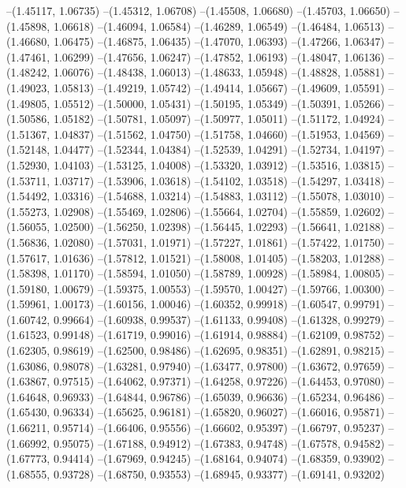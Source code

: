--(1.45117, 1.06735)
--(1.45312, 1.06708)
--(1.45508, 1.06680)
--(1.45703, 1.06650)
--(1.45898, 1.06618)
--(1.46094, 1.06584)
--(1.46289, 1.06549)
--(1.46484, 1.06513)
--(1.46680, 1.06475)
--(1.46875, 1.06435)
--(1.47070, 1.06393)
--(1.47266, 1.06347)
--(1.47461, 1.06299)
--(1.47656, 1.06247)
--(1.47852, 1.06193)
--(1.48047, 1.06136)
--(1.48242, 1.06076)
--(1.48438, 1.06013)
--(1.48633, 1.05948)
--(1.48828, 1.05881)
--(1.49023, 1.05813)
--(1.49219, 1.05742)
--(1.49414, 1.05667)
--(1.49609, 1.05591)
--(1.49805, 1.05512)
--(1.50000, 1.05431)
--(1.50195, 1.05349)
--(1.50391, 1.05266)
--(1.50586, 1.05182)
--(1.50781, 1.05097)
--(1.50977, 1.05011)
--(1.51172, 1.04924)
--(1.51367, 1.04837)
--(1.51562, 1.04750)
--(1.51758, 1.04660)
--(1.51953, 1.04569)
--(1.52148, 1.04477)
--(1.52344, 1.04384)
--(1.52539, 1.04291)
--(1.52734, 1.04197)
--(1.52930, 1.04103)
--(1.53125, 1.04008)
--(1.53320, 1.03912)
--(1.53516, 1.03815)
--(1.53711, 1.03717)
--(1.53906, 1.03618)
--(1.54102, 1.03518)
--(1.54297, 1.03418)
--(1.54492, 1.03316)
--(1.54688, 1.03214)
--(1.54883, 1.03112)
--(1.55078, 1.03010)
--(1.55273, 1.02908)
--(1.55469, 1.02806)
--(1.55664, 1.02704)
--(1.55859, 1.02602)
--(1.56055, 1.02500)
--(1.56250, 1.02398)
--(1.56445, 1.02293)
--(1.56641, 1.02188)
--(1.56836, 1.02080)
--(1.57031, 1.01971)
--(1.57227, 1.01861)
--(1.57422, 1.01750)
--(1.57617, 1.01636)
--(1.57812, 1.01521)
--(1.58008, 1.01405)
--(1.58203, 1.01288)
--(1.58398, 1.01170)
--(1.58594, 1.01050)
--(1.58789, 1.00928)
--(1.58984, 1.00805)
--(1.59180, 1.00679)
--(1.59375, 1.00553)
--(1.59570, 1.00427)
--(1.59766, 1.00300)
--(1.59961, 1.00173)
--(1.60156, 1.00046)
--(1.60352, 0.99918)
--(1.60547, 0.99791)
--(1.60742, 0.99664)
--(1.60938, 0.99537)
--(1.61133, 0.99408)
--(1.61328, 0.99279)
--(1.61523, 0.99148)
--(1.61719, 0.99016)
--(1.61914, 0.98884)
--(1.62109, 0.98752)
--(1.62305, 0.98619)
--(1.62500, 0.98486)
--(1.62695, 0.98351)
--(1.62891, 0.98215)
--(1.63086, 0.98078)
--(1.63281, 0.97940)
--(1.63477, 0.97800)
--(1.63672, 0.97659)
--(1.63867, 0.97515)
--(1.64062, 0.97371)
--(1.64258, 0.97226)
--(1.64453, 0.97080)
--(1.64648, 0.96933)
--(1.64844, 0.96786)
--(1.65039, 0.96636)
--(1.65234, 0.96486)
--(1.65430, 0.96334)
--(1.65625, 0.96181)
--(1.65820, 0.96027)
--(1.66016, 0.95871)
--(1.66211, 0.95714)
--(1.66406, 0.95556)
--(1.66602, 0.95397)
--(1.66797, 0.95237)
--(1.66992, 0.95075)
--(1.67188, 0.94912)
--(1.67383, 0.94748)
--(1.67578, 0.94582)
--(1.67773, 0.94414)
--(1.67969, 0.94245)
--(1.68164, 0.94074)
--(1.68359, 0.93902)
--(1.68555, 0.93728)
--(1.68750, 0.93553)
--(1.68945, 0.93377)
--(1.69141, 0.93202)
